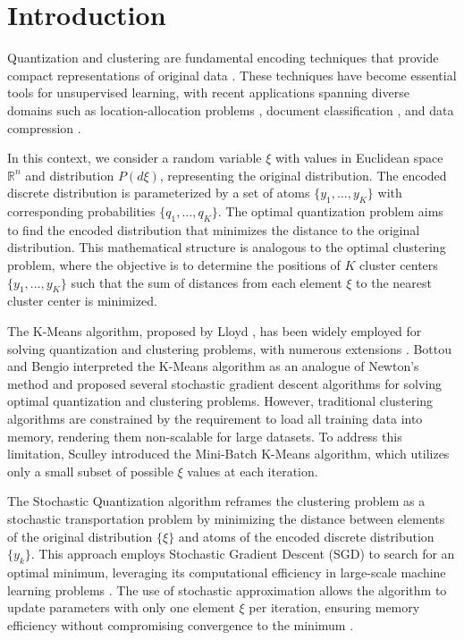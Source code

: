 \section{Introduction}

Quantization and clustering are fundamental encoding techniques that provide compact representations of original data \cite{Graf_Luschgy_2000,Jain_2010,Scholkopf_Smola_2002}. These techniques have become essential tools for unsupervised learning, with recent applications spanning diverse domains such as location-allocation problems \cite{Wang_Wei_2020}, document classification \cite{Radomirovic_2023,Widodo_2011}, and data compression \cite{Wan_2019}.

In this context, we consider a random variable $\xi$ with values in Euclidean space $\mathbb{R}^n$ and distribution $P(d\xi)$, representing the original distribution. The encoded discrete distribution is parameterized by a set of atoms $\{y_1, \ldots, y_K\}$ with corresponding probabilities $\{q_1, \ldots, q_K\}$. The optimal quantization problem aims to find the encoded distribution that minimizes the distance to the original distribution. This mathematical structure is analogous to the optimal clustering problem, where the objective is to determine the positions of $K$ cluster centers $\{y_1, \ldots, y_K\}$ such that the sum of distances from each element $\xi$ to the nearest cluster center is minimized.

The K-Means algorithm, proposed by Lloyd \cite{Lloyd_1982}, has been widely employed for solving quantization and clustering problems, with numerous extensions \cite{Jain_2010}. Bottou and Bengio \cite{Bottou_1994} interpreted the K-Means algorithm as an analogue of Newton's method and proposed several stochastic gradient descent algorithms for solving optimal quantization and clustering problems. However, traditional clustering algorithms are constrained by the requirement to load all training data into memory, rendering them non-scalable for large datasets. To address this limitation, Sculley \cite{Sculley_2010} introduced the Mini-Batch K-Means algorithm, which utilizes only a small subset of possible $\xi$ values at each iteration.

The Stochastic Quantization algorithm reframes the clustering problem as a stochastic transportation problem \cite{Kuzmenko_Uryasev_2019,Lakshmanan_Pichler_2023} by minimizing the distance between elements of the original distribution $\{\xi\}$ and atoms of the encoded discrete distribution $\{y_k\}$. This approach employs Stochastic Gradient Descent (SGD) \cite{ermoliev1976stochastic,kiefer1952stochastic,Robbins_Monro_1951} to search for an optimal minimum, leveraging its computational efficiency in large-scale machine learning problems \cite{Bottou_2010}. The use of stochastic approximation allows the algorithm to update parameters with only one element $\xi$ per iteration, ensuring memory efficiency without compromising convergence to the minimum \cite{Newton_Yousefian_Pasupathy_2018}.

